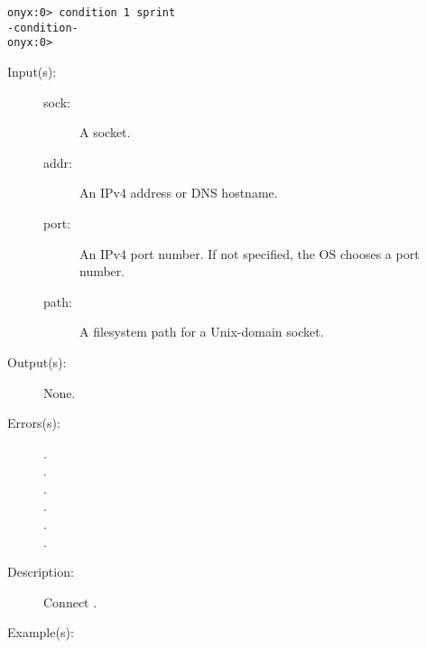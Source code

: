 \begin{description}
\begin{description}
\begin{verbatim}
onyx:0> condition 1 sprint
-condition-
onyx:0>
		\end{verbatim}
	\end{description}
\label{systemdict:connect}
\item[{\onyxop{sock addr port}{connect}{--}}: ]
\item[{\onyxop{sock path}{connect}{--}}: ]
	\begin{description}\item[]
	\item[Input(s): ]
		\begin{description}\item[]
		\item[sock: ]
			A socket.
		\item[addr: ]
			An IPv4 address or DNS hostname.
		\item[port: ]
			An IPv4 port number.  If not specified, the OS chooses a
			port number.
		\item[path: ]
			A filesystem path for a Unix-domain socket.
		\end{description}
	\item[Output(s): ] None.
	\item[Errors(s): ]
		\begin{description}\item[]
		\item[.]
		\item[.]
		\item[.]
		\item[.]
		\item[.]
		\item[.]
		\end{description}
	\item[Description: ]
		Connect .
	\item[Example(s): ]\begin{verbatim}


\end{verbatim}
\end{description}
\end{description}
